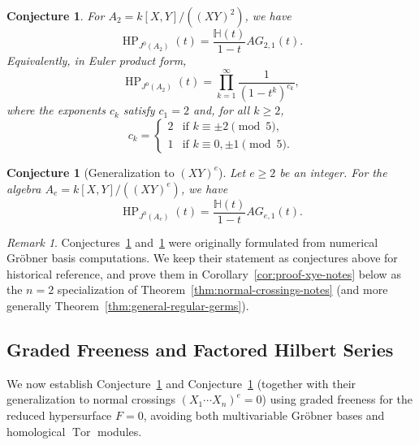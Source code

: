 \documentclass[a4paper, 12pt]{amsart}
\newtheorem{conjecture}[theorem]{Conjecture}
\theoremstyle{remark}
\newtheorem{remark}[theorem]{Remark}
\begin{document}
\begin{conjecture}
\label{conj:xy2-hilbert-series}
For $A_2 = k[X, Y] / ((XY)^2)$, we have
\begin{equation}
  \label{eq:conj-xy2-hp}
  \operatorname{HP}_{J^0(A_2)}(t) = \frac{\mathbb{H}(t)}{1 - t}AG_{2, 1}(t).
\end{equation}
Equivalently,
in Euler product form,
\begin{equation}
  \label{eq:conj-xy2-euler}
  \operatorname{HP}_{J^0(A_2)}(t) = \prod_{k=1}^\infty \frac{1}{(1 - t^k)^{c_k}},
\end{equation}
where the exponents $c_k$ satisfy $c_1 = 2$ and,
for all $k \ge 2$,
\begin{equation}
  c_k = \begin{cases}
    2 & \text{if } k \equiv \pm 2 \pmod 5, \\
    1 & \text{if } k \equiv 0, \pm 1 \pmod 5.
  \end{cases}
\end{equation}
\end{conjecture}

\begin{conjecture}[Generalization to $(XY)^e$]
\label{conj:xye-generalization}
Let $e \ge 2$ be an integer.
For the algebra $A_e = k[X, Y]/((XY)^e)$, we have
\begin{equation}
  \operatorname{HP}_{J^0(A_e)}(t) = \frac{\mathbb{H}(t)}{1 - t}AG_{e, 1}(t).
\end{equation}
\end{conjecture}

\begin{remark}
\label{rmk:status-of-conjectures}
Conjectures~\ref{conj:xy2-hilbert-series} and~\ref{conj:xye-generalization} were originally formulated from numerical Gröbner basis computations.
We keep their statement as conjectures above for historical reference,
and prove them in Corollary~\ref{cor:proof-xye-notes} below as the $n = 2$ specialization of Theorem~\ref{thm:normal-crossings-notes} (and more generally Theorem~\ref{thm:general-regular-germs}).
\end{remark}

\subsection{Graded Freeness and Factored Hilbert Series}
\label{subsec:finite-jet-truncation}

We now establish Conjecture~\ref{conj:xy2-hilbert-series} and Conjecture~\ref{conj:xye-generalization}
(together with their generalization to normal crossings $(X_1 \cdots X_n)^e = 0$)
using graded freeness for the reduced hypersurface $F = 0$,
avoiding both multivariable Gröbner bases and homological $\operatorname{Tor}$ modules.
\end{document}
